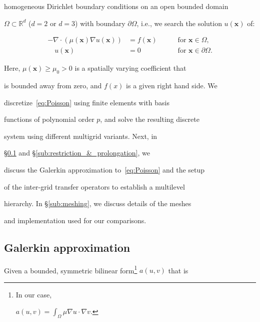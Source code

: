 \documentclass[smallcondensed,final]{svjour3}     %
\newcommand{\bs}[1]{\ensuremath{\boldsymbol #1}}
\begin{document}
homogeneous Dirichlet boundary conditions on an open bounded domain

$\Omega\subset\mathbb R^d$ ($d=2$ or $d=3$) with boundary $\partial

\Omega$, i.e., we search the solution $u(\bs x)$ of:

\begin{equation}\label{eq:Poisson}

  \begin{aligned}

    -\nabla\cdot\left(\mu(\bs x)\nabla u(\bs x)\right) &= f(\bs x) \quad &&\text{ for } \bs x\in \Omega,\\

    \quad u(\bs x)& = 0  \quad &&\text{ for } \bs x\in \partial\Omega.

  \end{aligned}

\end{equation}

Here, $\mu(\bs x)\ge \mu_0>0$ is a spatially varying coefficient that

is bounded away from zero, and $f(x)$ is a given right hand side. We

discretize~\eqref{eq:Poisson} using finite elements with basis

functions of polynomial order $p$, and solve the resulting discrete

system using different multigrid variants. Next, in

\S\ref{subsec:galerkin} and \S\ref{sub:restriction_&_prolongation}, we

discuss the Galerkin approximation to~\eqref{eq:Poisson} and the setup

of the inter-grid transfer operators to establish a multilevel

hierarchy. In \S\ref{sub:meshing}, we discuss details of the meshes

and implementation used for our comparisons.



\subsection{Galerkin approximation} \label{subsec:galerkin}



Given a bounded, symmetric bilinear form\footnote{In our case,

$a(u,v)=\int_\Omega \mu\nabla u \cdot \nabla v$.} $a(u,v)$ that is
\end{document}
